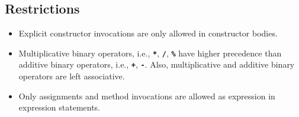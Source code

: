 \subsection*{Restrictions}

\begin{itemize}
\item Explicit constructor invocations are only allowed in constructor bodies.

\item Multiplicative binary operators, i.e., \textbf{\texttt{*}}, \textbf{\texttt{/}}, \textbf{\texttt{\%}} have higher precedence than additive binary operators, i.e., \textbf{\texttt{+}}, \textbf{\texttt{-}}.
Also, multiplicative and additive binary operators are left associative.

\item Only assignments and method invocations are allowed as expression in expression statements.

\end{itemize}
